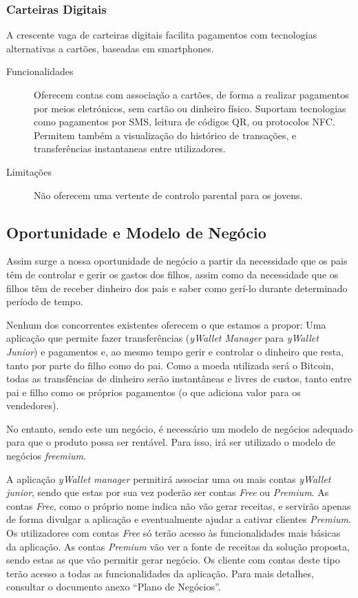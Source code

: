 \documentclass{article}
\begin{document}
    \subsubsection{Carteiras Digitais}  

      A crescente vaga de carteiras digitais facilita pagamentos com tecnologias alternativas a cartões, baseadas em smartphones.

      \begin{description}
        \item[Funcionalidades]Oferecem contas com associação a cartões, de forma a realizar pagamentos por meios eletrónicos, sem cartão ou dinheiro físico. Suportam tecnologias como pagamentos por SMS, leitura de códigos QR, ou protocolos NFC. Permitem também a visualização do histórico de transações, e transferências instantaneas entre utilizadores.
        \item[Limitações]Não oferecem uma vertente de controlo parental para os jovens.
      \end{description}

  \subsection{Oportunidade e Modelo de Negócio}

    Assim surge a nossa oportunidade de negócio a partir da necessidade que os pais têm de controlar e gerir os gastos dos filhos, assim como da necessidade que os filhos têm de receber dinheiro dos pais e saber como gerí-lo durante determinado período de tempo.

    Nenhum dos concorrentes existentes oferecem o que estamos a propor: Uma aplicação que permite fazer transferências (\emph{yWallet Manager }para \emph{yWallet Junior}) e pagamentos e, ao mesmo tempo gerir e controlar o dinheiro que resta, tanto por parte do filho como do pai. Como a moeda utilizada será o Bitcoin, todas as transfências de dinheiro serão instantâneas e livres de custos, tanto entre pai e filho como os próprios pagamentos (o que adiciona valor para os vendedores).
  
    No entanto, sendo este um negócio, é necessário um modelo de negócios adequado para que o produto possa ser rentável. Para isso, irá ser utilizado o modelo de negócios \emph{freemium}.
  
    A aplicação \emph{yWallet manager} permitirá associar uma ou mais contas \emph{yWallet junior}, sendo que estas por sua vez poderão ser contas \emph{Free} ou \emph{Premium}. As contas \emph{Free}, como o próprio nome indica não vão gerar receitas, e servirão apenas de forma divulgar a aplicação e eventualmente ajudar a cativar clientes \emph{Premium}. Os utilizadores com contas \emph{Free} só terão acesso às funcionalidades mais básicas da aplicação. As contas \emph{Premium} vão ver a fonte de receitas da solução proposta, sendo estas as que vão permitir gerar negócio. Os cliente com contas deste tipo terão acesso a todas as funcionalidades da aplicação. Para mais detalhes, consultar o documento anexo ``Plano de Negócios''.
\end{document}
